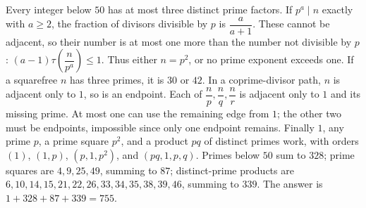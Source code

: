 Every integer below $50$ has at most three distinct prime factors. If $p^a\mid n$ exactly with $a\ge 2$, the fraction of divisors divisible by $p$ is $\dfrac{a}{a+1}$. These cannot be adjacent, so their number is at most one more than the number not divisible by $p$: $(a-1)\tau(\dfrac{n}{p^a})\le 1$. Thus either $n=p^2$, or no prime exponent exceeds one. If a squarefree $n$ has three primes, it is $30$ or $42$. In a coprime-divisor path, $n$ is adjacent only to $1$, so is an endpoint. Each of $\dfrac{n}{p},\dfrac{n}{q},\dfrac{n}{r}$ is adjacent only to $1$ and its missing prime. At most one can use the remaining edge from $1$; the other two must be endpoints, impossible since only one endpoint remains. Finally $1$, any prime $p$, a prime square $p^2$, and a product $pq$ of distinct primes work, with orders $(1)$, $(1,p)$, $(p,1,p^2)$, and $(pq,1,p,q)$. Primes below $50$ sum to $328$; prime squares are $4,9,25,49$, summing to $87$; distinct-prime products are $6,10,14,15,21,22,26,33,34,35,38,39,46$, summing to $339$. The answer is $1+328+87+339=\boxed{755}$.
